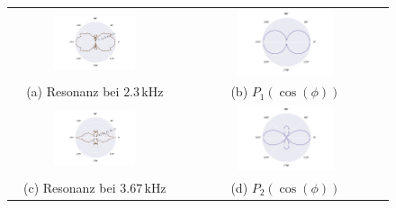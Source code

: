 \begin{figure}[H]
  \centering
  \begin{tabular}{cc}
    \includegraphics[width=0.5\textwidth]{Daten/Wasserstoff/peak0.pdf} &   \includegraphics[width=0.5\textwidth]{Daten/Wasserstoff/peakLeg0.pdf} \\
  (a) Resonanz bei $2.3 \,\si{\kilo\hertz} $& (b) $P_1(\cos(\phi))$ \\[6pt]
  \includegraphics[width=0.5\textwidth]{Daten/Wasserstoff/peak1.pdf} &   \includegraphics[width=0.5\textwidth]{Daten/Wasserstoff/peakLeg1.pdf} \\
  (c) Resonanz bei $3.67 \,\si{\kilo\hertz}$ & (d) $P_2(\cos(\phi))$ \\[6pt]

\end{tabular}
\end{figure}

